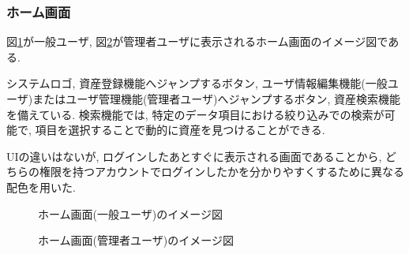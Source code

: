 \documentclass[11ptm]{jsarticle}
\begin{document}
\subsubsection{ホーム画面}
\label{sec:ホーム画面}
図\ref{fig:ホーム画面(一般ユーザ)のイメージ図}が一般ユーザ, 図\ref{fig:ホーム画面(管理者ユーザ)のイメージ図}が管理者ユーザに表示されるホーム画面のイメージ図である. \par
システムロゴ, 資産登録機能へジャンプするボタン, ユーザ情報編集機能(一般ユーザ)またはユーザ管理機能(管理者ユーザ)へジャンプするボタン, 資産検索機能を備えている. 検索機能では, 特定のデータ項目における絞り込みでの検索が可能で, 項目を選択することで動的に資産を見つけることができる. \par
UIの違いはないが, ログインしたあとすぐに表示される画面であることから, どちらの権限を持つアカウントでログインしたかを分かりやすくするために異なる配色を用いた.
\begin{figure}[h]
  \centering
  \caption{\label{fig:ホーム画面(一般ユーザ)のイメージ図}ホーム画面(一般ユーザ)のイメージ図}
\end{figure}
\begin{figure}[h]
  \centering
  \caption{\label{fig:ホーム画面(管理者ユーザ)のイメージ図}ホーム画面(管理者ユーザ)のイメージ図}
\end{figure}
\end{document}
